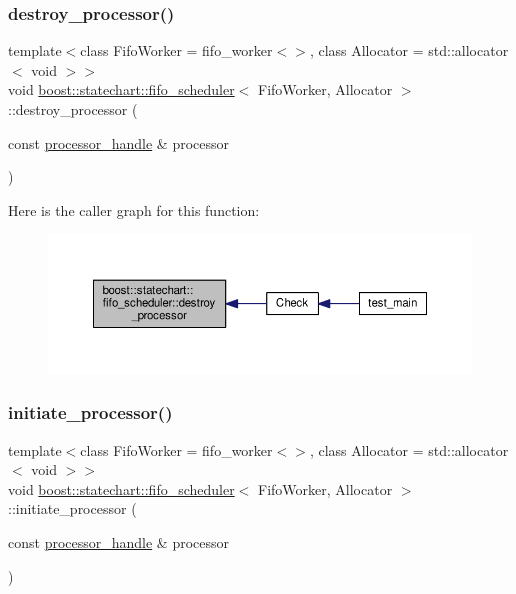 \subsubsection{\texorpdfstring{destroy\+\_\+processor()}{destroy\_processor()}}
{\footnotesize\ttfamily template$<$class Fifo\+Worker = fifo\+\_\+worker$<$$>$, class Allocator = std\+::allocator$<$ void $>$$>$ \\
void \mbox{\hyperlink{classboost_1_1statechart_1_1fifo__scheduler}{boost\+::statechart\+::fifo\+\_\+scheduler}}$<$ Fifo\+Worker, Allocator $>$\+::destroy\+\_\+processor (\begin{DoxyParamCaption}\item[{const \mbox{\hyperlink{classboost_1_1statechart_1_1fifo__scheduler_ada526939c16c4f8118bc4d7bbf09ad7d}{processor\+\_\+handle}} \&}]{processor }\end{DoxyParamCaption})\hspace{0.3cm}{\ttfamily [inline]}}

Here is the caller graph for this function\+:
\nopagebreak
\begin{figure}[H]
\begin{center}
\leavevmode
\includegraphics[width=350pt]{classboost_1_1statechart_1_1fifo__scheduler_a4a25edb5f67e9dd339a6f6cfe6bcc873_icgraph}
\end{center}
\end{figure}
\mbox{\label{classboost_1_1statechart_1_1fifo__scheduler_a466f16a9904ebdb1123948d3d2b3cd66}} 
\subsubsection{\texorpdfstring{initiate\+\_\+processor()}{initiate\_processor()}}
{\footnotesize\ttfamily template$<$class Fifo\+Worker = fifo\+\_\+worker$<$$>$, class Allocator = std\+::allocator$<$ void $>$$>$ \\
void \mbox{\hyperlink{classboost_1_1statechart_1_1fifo__scheduler}{boost\+::statechart\+::fifo\+\_\+scheduler}}$<$ Fifo\+Worker, Allocator $>$\+::initiate\+\_\+processor (\begin{DoxyParamCaption}\item[{const \mbox{\hyperlink{classboost_1_1statechart_1_1fifo__scheduler_ada526939c16c4f8118bc4d7bbf09ad7d}{processor\+\_\+handle}} \&}]{processor }\end{DoxyParamCaption})\hspace{0.3cm}{\ttfamily [inline]}}

